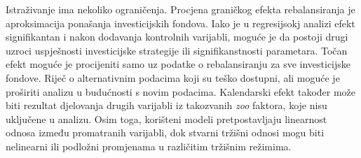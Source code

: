 \documentclass[
  letterpaper,
  DIV=11,
  numbers=noendperiod]{scrartcl}
\begin{document}
Istraživanje ima nekoliko ograničenja. Procjena graničkog efekta
rebalansiranja je aproksimacija ponašanja investicijskih fondova. Iako
je u regresijsokj analizi efekt signifikantan i nakon dodavanja
kontrolnih varijabli, moguće je da postoji drugi uzroci uspješnosti
investicijske strategije ili signifikanstnosti parametara. Točan efekt
moguće je procijeniti samo uz podatke o rebalansiranju za sve
investicijske fondove. Riječ o alternativnim podacima koji su teško
dostupni, ali moguće je proširiti analizu u budućnosti s novim podacima.
Kalendarski efekt također može biti rezultat djelovanja drugih varijabli
iz takozvanih \emph{zoo} faktora, koje nisu uključene u analizu. Osim
toga, korišteni modeli pretpostavljaju linearnost odnosa između
promatranih varijabli, dok stvarni tržišni odnosi mogu biti nelinearni
ili podložni promjenama u različitim tržišnim režimima.
\end{document}
